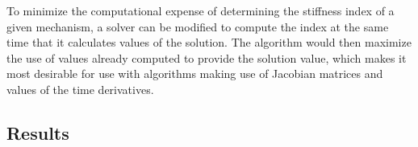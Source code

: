 \documentclass[12pt]{ussci}
\begin{document}
To minimize the computational expense of determining the stiffness index of a given mechanism, a solver can be modified to compute the index at the same time that it calculates values of the solution.
The algorithm would then maximize the use of values already computed to provide the solution value, which makes it most desirable for use with algorithms making use of Jacobian matrices and values of the time derivatives.

\subsection{Results}

\end{document}
